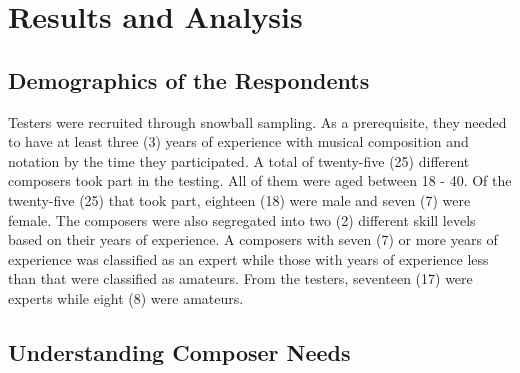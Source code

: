 
\chapter{Results and Analysis}	

	\section{Demographics of the Respondents}
	\label{sec:demographics}
		
		Testers were recruited through snowball sampling. As a prerequisite, they needed to have at least three (3) years of experience with musical composition and notation by the time they participated. A total of twenty-five (25) different composers took part in the testing. All of them were aged between 18 - 40. Of the twenty-five (25) that took part, eighteen (18) were male and seven (7) were female. The composers were also segregated into two (2) different skill levels based on their years of experience. A composers with seven (7) or more years of experience was classified as an expert while those with years of experience less than that were classified as amateurs. From the testers, seventeen (17) were experts while eight (8) were amateurs. 

	\section{Understanding Composer Needs}

